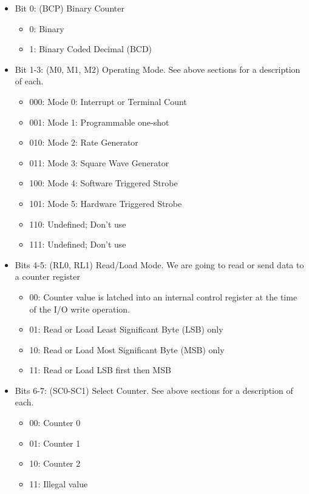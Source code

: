 \documentclass[document.tex]{subfiles}
\begin{document}
\begin{english}

\begin{itemize}
\item  Bit 0: (BCP) Binary Counter
\begin{itemize}
\item  0: Binary
\item  1: Binary Coded Decimal (BCD)
\end{itemize}
\item  Bit 1-3: (M0, M1, M2) Operating Mode. See above sections for a description of each.
\begin{itemize}
\item  000: Mode 0: Interrupt or Terminal Count
\item   001: Mode 1: Programmable one-shot
\item  010: Mode 2: Rate Generator
\item  011: Mode 3: Square Wave Generator
\item  100: Mode 4: Software Triggered Strobe
\item  101: Mode 5: Hardware Triggered Strobe
\item  110: Undefined; Don't use
\item  111: Undefined; Don't use
\end{itemize}
\item   Bits 4-5: (RL0, RL1) Read/Load Mode. We are going to read or send data to a counter register
\begin{itemize}
\item  00: Counter value is latched into an internal control register at the time of the I/O write operation.
\item   01: Read or Load Least Significant Byte (LSB) only
\item  10: Read or Load Most Significant Byte (MSB) only
\item  11: Read or Load LSB first then MSB
\end{itemize}
\item  Bits 6-7: (SC0-SC1) Select Counter. See above sections for a description of each.
\begin{itemize}
\item   00: Counter 0
\item  01: Counter 1
\item  10: Counter 2
\item  11: Illegal value
\end{itemize}

\end{itemize}
\end{english}
\end{document}
